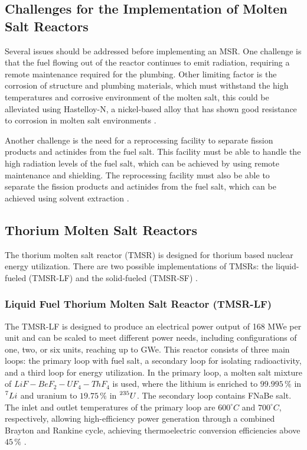 \subsection{Challenges for the Implementation of Molten Salt Reactors}

Several issues should be addressed before implementing an MSR. One challenge is that the fuel flowing out of the reactor continues to emit radiation, requiring a remote maintenance required for the plumbing. Other limiting factor is the corrosion of structure and plumbing materials, which must withstand the high temperatures and corrosive environment of the molten salt, this could be alleviated using Hastelloy-N, a nickel-based alloy that has shown good resistance to corrosion in molten salt environments \cite{TMSR_book,Haynes2024}.

Another challenge is the need for a reprocessing facility to separate fission products and actinides from the fuel salt. This facility must be able to handle the high radiation levels of the fuel salt, which can be achieved by using remote maintenance and shielding. The reprocessing facility must also be able to separate the fission products and actinides from the fuel salt, which can be achieved using solvent extraction \cite{TMSR_book}.

\subsection{Thorium Molten Salt Reactors}

The thorium molten salt reactor (TMSR) is designed for thorium based nuclear energy utilization. There are two possible implementations of TMSRs: the liquid-fueled (TMSR-LF) and the solid-fueled (TMSR-SF) \cite{TMSR_book}.

\subsubsection{Liquid Fuel Thorium Molten Salt Reactor (TMSR-LF)}

The TMSR-LF is designed to produce an electrical power output of 168 MWe per unit and can be scaled to meet different power needs, including configurations of one, two, or six units, reaching up to GWe. This reactor consists of three main loops: the primary loop with fuel salt, a secondary loop for isolating radioactivity, and a third loop for energy utilization. In the primary loop, a molten salt mixture of \(LiF-BeF_2-UF_4-ThF_4\) is used, where the lithium is enriched to \(99.995 \, \%\) in \(\prescript{7}{}{Li}\) and uranium to \(19.75 \, \%\) in \(\prescript{235}{}{U}\). The secondary loop contains FNaBe salt. The inlet and outlet temperatures of the primary loop are \(600^{\circ}C\) and \(700^{\circ}C\), respectively, allowing high-efficiency power generation through a combined Brayton and Rankine cycle, achieving thermoelectric conversion efficiencies above \(45 \, \%\) \cite{TMSR_book}.

